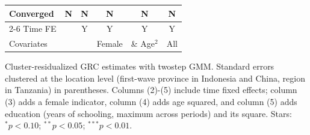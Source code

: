 \begin{table}[htbp]
\begin{threeparttable}
\begin{tabular}{l ccccc}
Converged           &           N   &           N   &           N   &           N   &           N   \\
\cmidrule{2-6} Time FE & & Y & Y & Y & Y \\ Covariates & & & Female & \& Age$^2$ & All \\ \bottomrule \end{tabular} \begin{tablenotes}[flushleft] \footnotesize \item{Cluster-residualized GRC estimates with twostep GMM. Standard errors clustered at the location level (first-wave province in Indonesia and China, region in Tanzania) in parentheses. Columns (2)-(5) include time fixed effects; column (3) adds a female indicator, column (4) adds age squared, and column (5) adds education (years of schooling, maximum across periods) and its square. Stars: $^{*} p<0.10$; $^{**} p<0.05$; $^{***} p<0.01$.} \end{tablenotes} \end{threeparttable} \end{table}
